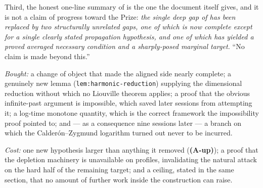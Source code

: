 Third, the honest one-line summary of  is the one the document itself
gives, and it is not a claim of progress toward the Prize: \emph{the single
deep gap of  has been replaced by two structurally unrelated gaps, one
of which is now complete except for a single clearly stated propagation
hypothesis, and one of which has yielded a proved averaged necessary condition
and a sharply-posed marginal target.} ``No claim is made beyond this.''

\begin{obsv}
\label{obs:reframe-ledger}
\emph{Bought:} a change of object that made the aligned side nearly complete;
a genuinely new lemma (\texttt{lem:harmonic-reduction}) supplying the
dimensional reduction without which no Liouville theorem applies; a proof that
the obvious infinite-past argument is impossible, which saved later sessions
from attempting it; a log-time monotone quantity, which is the correct
framework the impossibility proof pointed to; and --- as a consequence
nine sessions later --- a branch on which the Calder\'on--Zygmund logarithm
turned out never to be incurred.

\smallskip
\emph{Cost:} one new hypothesis larger than anything it removed
(\textbf{(A-up)}); a proof that the  depletion machinery is unavailable
on profiles, invalidating the natural attack on the hard half of the remaining
target; and a ceiling, stated in the same section, that no amount of further
work inside the construction can raise.
\end{obsv}
